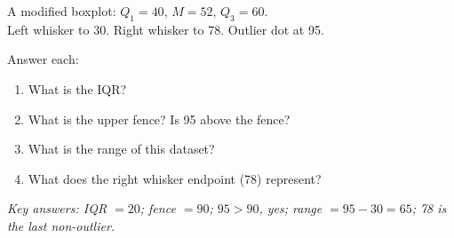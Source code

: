 \documentclass[aspectratio=169, 11pt]{beamer}
\begin{document}
{
\begin{frame}[t, plain]
  \vspace{0.8em}%
  \hspace{0.55cm}%
  \begin{minipage}{0.9\textwidth}
    \small
    A modified boxplot: $Q_1 = 40$, $M = 52$, $Q_3 = 60$.\\
    Left whisker to 30. Right whisker to 78. Outlier dot at 95.

    \vspace{0.6em}
    Answer each:
    \begin{enumerate}\setlength{\itemsep}{0.5em}
      \item What is the IQR?
      \item What is the upper fence? \quad Is 95 above the fence?
      \item What is the range of this dataset?
      \item What does the right whisker endpoint (78) represent?
    \end{enumerate}

    \vspace{0.5em}
    {\color{navy}\small\textit{Key answers: IQR $= 20$;
    fence $= 90$; $95 > 90$, yes; range $= 95 - 30 = 65$;
    78 is the last non-outlier.}}
  \end{minipage}
\end{frame}
}
\end{document}
